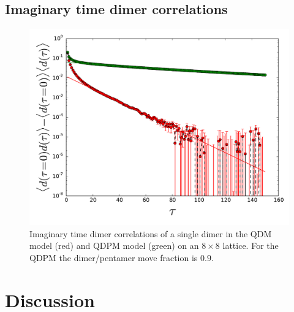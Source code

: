 \documentclass[twocolumn,prb,aps,floatfix,superscriptaddress]{revtex4-1}
\begin{document}
    \subsection{Imaginary time dimer correlations}
    \begin{figure}[htpb]
        \centering
        \includegraphics[width=0.8\linewidth]{dimer_origin_time_cor.pdf}
        \caption{Imaginary time dimer correlations of a single dimer in the QDM model (red) and QDPM
        model (green) on an $8\times8$ lattice. For the QDPM the dimer/pentamer move fraction is $0.9$. }
        \label{fig:}

    \end{figure}

\section{Discussion}



\end{document}

